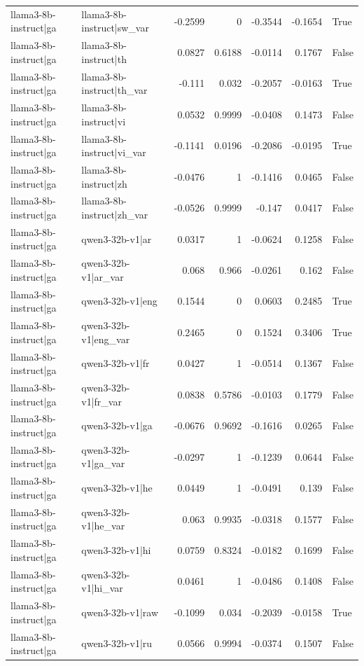 \begin{table}
\begin{tabular}{l l r r r r l}
llama3-8b-instruct|ga & llama3-8b-instruct|sw_var & -0.2599 & 0 & -0.3544 & -0.1654 & True \\
llama3-8b-instruct|ga & llama3-8b-instruct|th & 0.0827 & 0.6188 & -0.0114 & 0.1767 & False \\
llama3-8b-instruct|ga & llama3-8b-instruct|th_var & -0.111 & 0.032 & -0.2057 & -0.0163 & True \\
llama3-8b-instruct|ga & llama3-8b-instruct|vi & 0.0532 & 0.9999 & -0.0408 & 0.1473 & False \\
llama3-8b-instruct|ga & llama3-8b-instruct|vi_var & -0.1141 & 0.0196 & -0.2086 & -0.0195 & True \\
llama3-8b-instruct|ga & llama3-8b-instruct|zh & -0.0476 & 1 & -0.1416 & 0.0465 & False \\
llama3-8b-instruct|ga & llama3-8b-instruct|zh_var & -0.0526 & 0.9999 & -0.147 & 0.0417 & False \\
llama3-8b-instruct|ga & qwen3-32b-v1|ar & 0.0317 & 1 & -0.0624 & 0.1258 & False \\
llama3-8b-instruct|ga & qwen3-32b-v1|ar_var & 0.068 & 0.966 & -0.0261 & 0.162 & False \\
llama3-8b-instruct|ga & qwen3-32b-v1|eng & 0.1544 & 0 & 0.0603 & 0.2485 & True \\
llama3-8b-instruct|ga & qwen3-32b-v1|eng_var & 0.2465 & 0 & 0.1524 & 0.3406 & True \\
llama3-8b-instruct|ga & qwen3-32b-v1|fr & 0.0427 & 1 & -0.0514 & 0.1367 & False \\
llama3-8b-instruct|ga & qwen3-32b-v1|fr_var & 0.0838 & 0.5786 & -0.0103 & 0.1779 & False \\
llama3-8b-instruct|ga & qwen3-32b-v1|ga & -0.0676 & 0.9692 & -0.1616 & 0.0265 & False \\
llama3-8b-instruct|ga & qwen3-32b-v1|ga_var & -0.0297 & 1 & -0.1239 & 0.0644 & False \\
llama3-8b-instruct|ga & qwen3-32b-v1|he & 0.0449 & 1 & -0.0491 & 0.139 & False \\
llama3-8b-instruct|ga & qwen3-32b-v1|he_var & 0.063 & 0.9935 & -0.0318 & 0.1577 & False \\
llama3-8b-instruct|ga & qwen3-32b-v1|hi & 0.0759 & 0.8324 & -0.0182 & 0.1699 & False \\
llama3-8b-instruct|ga & qwen3-32b-v1|hi_var & 0.0461 & 1 & -0.0486 & 0.1408 & False \\
llama3-8b-instruct|ga & qwen3-32b-v1|raw & -0.1099 & 0.034 & -0.2039 & -0.0158 & True \\
llama3-8b-instruct|ga & qwen3-32b-v1|ru & 0.0566 & 0.9994 & -0.0374 & 0.1507 & False \\

\end{tabular}
\end{table}
